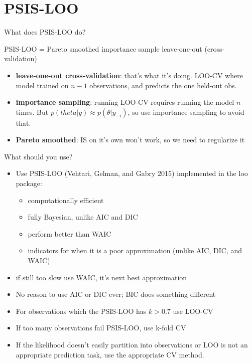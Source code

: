 \documentclass[ignorenonframetext,]{beamer}
\providecommand{\tightlist}{%
  \setlength{\itemsep}{0pt}\setlength{\parskip}{0pt}}
\begin{document}
\hypertarget{psis-loo}{%
\section{PSIS-LOO}\label{psis-loo}}

\begin{frame}{What does PSIS-LOO do?}
\protect\hypertarget{what-does-psis-loo-do}{}

PSIS-LOO = Pareto smoothed importance sample leave-one-out
(cross-validation)

\begin{itemize}
\tightlist
\item
  \textbf{leave-one-out cross-validation}: that’s what it’s doing.
  LOO-CV where model trained on \(n - 1\) observations, and predicts the
  one held-out obs.
\item
  \textbf{importance sampling}: running LOO-CV requires running the
  model \(n\) times. But \(p(theta|y) \approx p(\theta|y_{-i})\), so use
  importance sampling to avoid that.
\item
  \textbf{Pareto smoothed}: IS on it’s own won’t work, so we need to
  regularize it
\end{itemize}

\end{frame}

\begin{frame}{What should you use?}
\protect\hypertarget{what-should-you-use}{}

\begin{itemize}
\item
  Use PSIS-LOO (Vehtari, Gelman, and Gabry 2015) implemented in the loo
  package:

  \begin{itemize}
  \tightlist
  \item
    computationally efficient
  \item
    fully Bayesian, unlike AIC and DIC
  \item
    perform better than WAIC
  \item
    indicators for when it is a poor approximation (unlike AIC, DIC, and
    WAIC)
  \end{itemize}
\item
  if still too slow use WAIC, it’s next best approximation
\item
  No reason to use AIC or DIC ever; BIC does something different
\item
  For observations which the PSIS-LOO has \(k > 0.7\) use LOO-CV
\item
  If too many observations fail PSIS-LOO, use k-fold CV
\item
  If the likelihood doesn’t easily partition into observations or LOO is
  not an appropriate prediction task, use the appropriate CV method.
\end{itemize}

\end{frame}
\end{document}
